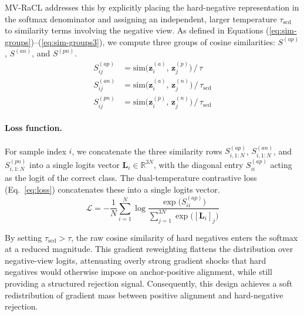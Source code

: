 \documentclass[lettersize,journal]{IEEEtran}
\begin{document}
MV-RaCL addresses this by explicitly placing the hard-negative representation in the softmax denominator and assigning an independent, larger temperature $\tau_{\mathrm{scd}}$ to similarity terms involving the negative view. As defined in Equations (\ref{eq:sim-groups})--(\ref{eq:sim-groups3}), we compute three groups of cosine similarities: $S^{(ap)}$, $S^{(an)}$, and $S^{(pn)}$.
\begin{align}
\label{eq:sim-groups}
S^{(ap)}_{ij} &= \mathrm{sim}\bigl(\mathbf{z}_i^{(a)},\, \mathbf{z}_j^{(p)}\bigr)\,/\,\tau \\
S^{(an)}_{ij} &= \mathrm{sim}\bigl(\mathbf{z}_i^{(a)},\, \mathbf{z}_j^{(n)}\bigr)\,/\,\tau_{\mathrm{scd}} \\
\label{eq:sim-groups3}
S^{(pn)}_{ij} &= \mathrm{sim}\bigl(\mathbf{z}_i^{(p)},\, \mathbf{z}_j^{(n)}\bigr)\,/\,\tau_{\mathrm{scd}}
\end{align}

\paragraph{Loss function.} For sample index $i$, we concatenate the three similarity rows $S^{(ap)}_{i,1:N}$, $S^{(an)}_{i,1:N}$, and $S^{(pn)}_{i,1:N}$ into a single logits vector $\mathbf{L}_i \in \mathbb{R}^{3N}$, with the diagonal entry $S^{(ap)}_{ii}$ acting as the logit of the correct class. The dual-temperature contrastive loss (Eq.~\ref{eq:loss}) concatenates these into a single logits vector.
\begin{equation}
\label{eq:loss}
\mathcal{L} = -\frac{1}{N}\sum_{i=1}^{N} \log \frac{\exp\bigl(S^{(ap)}_{ii}\bigr)}{\sum_{j=1}^{3N} \exp\bigl([\mathbf{L}_i]_{j}\bigr)}
\end{equation}

By setting $\tau_{\mathrm{scd}} > \tau$, the raw cosine similarity of hard negatives enters the softmax at a reduced magnitude. This gradient reweighting flattens the distribution over negative-view logits, attenuating overly strong gradient shocks that hard negatives would otherwise impose on anchor-positive alignment, while still providing a structured rejection signal. Consequently, this design achieves a soft redistribution of gradient mass between positive alignment and hard-negative rejection.
\end{document}
